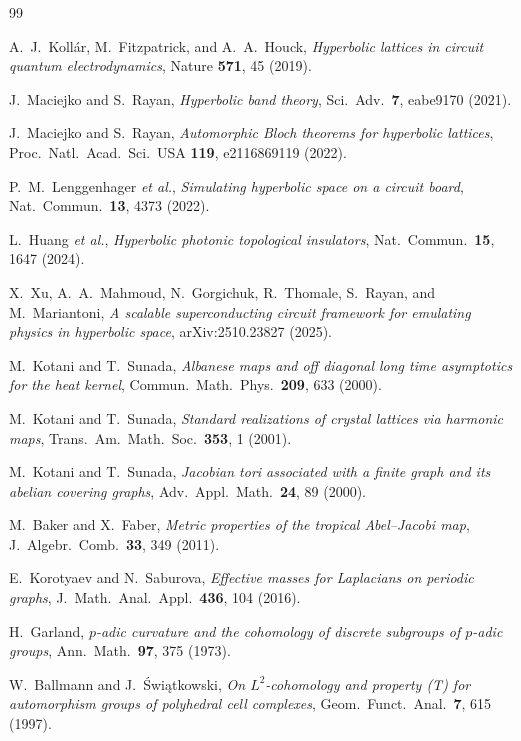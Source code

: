 \documentclass[aps,prb,reprint,amsmath,amssymb,floatfix,superscriptaddress]{revtex4-2}
\theoremstyle{plain}
\theoremstyle{definition}
\theoremstyle{remark}
\begin{document}
\begin{thebibliography}{99}

 A.~J.~Koll\'ar, M.~Fitzpatrick, and A.~A.~Houck,
\emph{Hyperbolic lattices in circuit quantum electrodynamics},
Nature \textbf{571}, 45 (2019).

 J.~Maciejko and S.~Rayan,
\emph{Hyperbolic band theory},
Sci.\ Adv.\ \textbf{7}, eabe9170 (2021).

 J.~Maciejko and S.~Rayan,
\emph{Automorphic Bloch theorems for hyperbolic lattices},
Proc.\ Natl.\ Acad.\ Sci.\ USA \textbf{119}, e2116869119 (2022).

 P.~M.~Lenggenhager \emph{et al.},
\emph{Simulating hyperbolic space on a circuit board},
Nat.\ Commun.\ \textbf{13}, 4373 (2022).

 L.~Huang \emph{et al.},
\emph{Hyperbolic photonic topological insulators},
Nat.\ Commun.\ \textbf{15}, 1647 (2024).

 X.~Xu, A.~A.~Mahmoud, N.~Gorgichuk, R.~Thomale, S.~Rayan, and M.~Mariantoni,
\emph{A scalable superconducting circuit framework for emulating physics in hyperbolic
space}, arXiv:2510.23827 (2025).

 M.~Kotani and T.~Sunada,
\emph{Albanese maps and off diagonal long time asymptotics for the heat kernel},
Commun.\ Math.\ Phys.\ \textbf{209}, 633 (2000).

 M.~Kotani and T.~Sunada,
\emph{Standard realizations of crystal lattices via harmonic maps},
Trans.\ Am.\ Math.\ Soc.\ \textbf{353}, 1 (2001).

 M.~Kotani and T.~Sunada,
\emph{Jacobian tori associated with a finite graph and its abelian covering graphs},
Adv.\ Appl.\ Math.\ \textbf{24}, 89 (2000).

 M.~Baker and X.~Faber,
\emph{Metric properties of the tropical Abel--Jacobi map},
J.\ Algebr.\ Comb.\ \textbf{33}, 349 (2011).

 E.~Korotyaev and N.~Saburova,
\emph{Effective masses for Laplacians on periodic graphs},
J.\ Math.\ Anal.\ Appl.\ \textbf{436}, 104 (2016).

 H.~Garland,
\emph{$p$-adic curvature and the cohomology of discrete subgroups of $p$-adic groups},
Ann.\ Math.\ \textbf{97}, 375 (1973).

 W.~Ballmann and J.~\'Swi\k{a}tkowski,
\emph{On $L^{2}$-cohomology and property (T) for automorphism groups of polyhedral cell
complexes},
Geom.\ Funct.\ Anal.\ \textbf{7}, 615 (1997).


\end{thebibliography}
\end{document}
